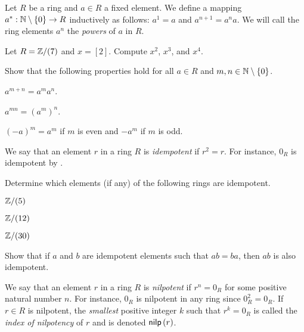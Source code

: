 \begin{dfn} \label{dfn:pow-elt}
Let \(R\) be a ring and \(a \in R\) a fixed element.
We define a mapping \(a^\ast : \mathbb{N} \setminus \{0\} \rightarrow R\) inductively as follows: \(a^1 = a\) and \(a^{n+1} = a^n a\).
We will call the ring elements \(a^n\) the \emph{powers} of \(a\) in \(R\).
\end{dfn}

\begin{exercise}
Let \(R = \mathbb{Z}/(7)\) and \(x = [2]\).
Compute \(x^2\), \(x^3\), and \(x^4\).
\end{exercise}

\begin{exercise} \label{exerc:ring-powers}
Show that the following properties hold for all \(a \in R\) and \(m,n \in \mathbb{N} \setminus \{0\}\).
\begin{proplist*}
\item \(a^{m+n} = a^m a^n\).
\item \(a^{mn} = (a^m)^n\).
\item \((-a)^m = a^m\) if \(m\) is even and \(-a^m\) if \(m\) is odd.
\end{proplist*}
\end{exercise}

\begin{dfn}[Idempotent] \label{dfn:idempotent}
We say that an element \(r\) in a ring \(R\) is \emph{idempotent}  if \(r^2 = r\).
For instance, \(0_R\) is idempotent by .
\end{dfn}

\begin{exercise}
Determine which elements (if any) of the following rings are idempotent.
\begin{proplist*}
\item \(\mathbb{Z}/(5)\)
\item \(\mathbb{Z}/(12)\)
\item \(\mathbb{Z}/(30)\)
\end{proplist*}
\end{exercise}

\begin{exercise}
Show that if \(a\) and \(b\) are idempotent elements such that \(ab = ba\), then \(ab\) is also idempotent.
\end{exercise}

\begin{dfn}[Nilpotent] \label{dfn:nilpotent}
We say that an element \(r\) in a ring \(R\) is \emph{nilpotent}  if \(r^n = 0_R\) for some positive natural number \(n\).
For instance, \(0_R\) is nilpotent in any ring since \(0_R^2 = 0_R\).
If \(r \in R\) is nilpotent, the \emph{smallest} positive integer \(k\) such that \(r^k = 0_R\) is called the \emph{index of nilpotency} of \(r\) and is denoted \(\mathsf{nilp}\left(r\right)\).
\end{dfn}

